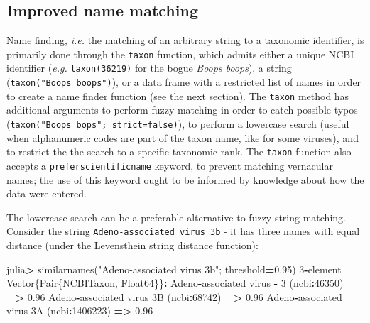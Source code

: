 \documentclass[11pt]{article}
\newenvironment{Shaded}{\begin{snugshade}}{\end{snugshade}}
\newcommand{\DataTypeTok}[1]{\textcolor[rgb]{0.13,0.29,0.53}{#1}}
\newcommand{\FloatTok}[1]{\textcolor[rgb]{0.00,0.00,0.81}{#1}}
\newcommand{\StringTok}[1]{\textcolor[rgb]{0.31,0.60,0.02}{#1}}
\newcommand{\FunctionTok}[1]{\textcolor[rgb]{0.00,0.00,0.00}{#1}}
\newcommand{\OperatorTok}[1]{\textcolor[rgb]{0.81,0.36,0.00}{\textbf{#1}}}
\newcommand{\NormalTok}[1]{#1}
\begin{document}
\hypertarget{improved-name-matching}{%
\subsection{Improved name matching}\label{improved-name-matching}}

Name finding, \emph{i.e.} the matching of an arbitrary string to a
taxonomic identifier, is primarily done through the \texttt{taxon}
function, which admits either a unique NCBI identifier (\emph{e.g.}
\texttt{taxon(36219)} for the bogue \emph{Boops boops}), a string
(\texttt{taxon("Boops\ boops")}), or a data frame with a restricted list
of names in order to create a name finder function (see the next
section). The \texttt{taxon} method has additional arguments to perform
fuzzy matching in order to catch possible typos
(\texttt{taxon("Boops\ bops";\ strict=false)}), to perform a lowercase
search (useful when alphanumeric codes are part of the taxon name, like
for some viruses), and to restrict the the search to a specific
taxonomic rank. The \texttt{taxon} function also accepts a
\texttt{preferscientificname} keyword, to prevent matching vernacular
names; the use of this keyword ought to be informed by knowledge about
how the data were entered.

The lowercase search can be a preferable alternative to fuzzy string
matching. Consider the string \texttt{Adeno-associated\ virus\ 3b} - it
has three names with equal distance (under the Levensthein string
distance function):

\begin{Shaded}
\begin{Highlighting}[]
\NormalTok{julia}\OperatorTok{\textgreater{}} \FunctionTok{similarnames}\NormalTok{(}\StringTok{"Adeno{-}associated virus 3b"}\NormalTok{; threshold}\OperatorTok{=}\FloatTok{0.95}\NormalTok{)}
\FloatTok{3}\OperatorTok{{-}}\NormalTok{element }\DataTypeTok{Vector}\NormalTok{\{}\DataTypeTok{Pair}\NormalTok{\{NCBITaxon, }\DataTypeTok{Float64}\NormalTok{\}\}}\OperatorTok{:}
\NormalTok{  Adeno}\OperatorTok{{-}}\NormalTok{associated virus }\OperatorTok{{-}} \FloatTok{3}\NormalTok{ (ncbi}\OperatorTok{:}\FloatTok{46350}\NormalTok{) }\OperatorTok{=\textgreater{}} \FloatTok{0.96}
\NormalTok{   Adeno}\OperatorTok{{-}}\NormalTok{associated virus }\FloatTok{3}\NormalTok{B (ncbi}\OperatorTok{:}\FloatTok{68742}\NormalTok{) }\OperatorTok{=\textgreater{}} \FloatTok{0.96}
\NormalTok{ Adeno}\OperatorTok{{-}}\NormalTok{associated virus }\FloatTok{3}\NormalTok{A (ncbi}\OperatorTok{:}\FloatTok{1406223}\NormalTok{) }\OperatorTok{=\textgreater{}} \FloatTok{0.96}
\end{Highlighting}
\end{Shaded}
\end{document}
